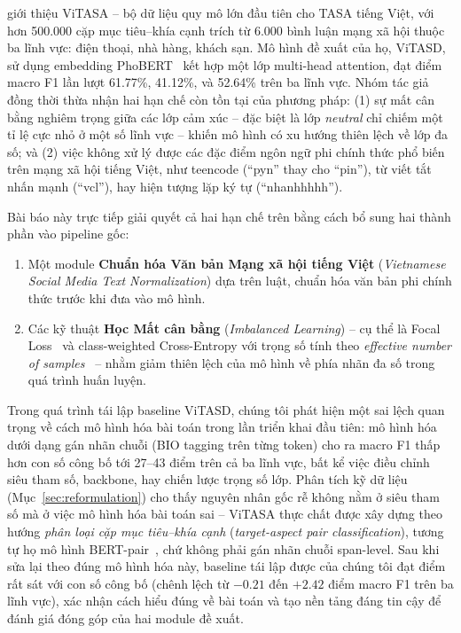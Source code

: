 \documentclass[11pt]{article}
\begin{document}
\citet{tran2025vitasa} giới thiệu ViTASA -- bộ dữ liệu quy mô lớn đầu tiên cho TASA tiếng Việt, với hơn 500.000 cặp mục tiêu--khía cạnh trích từ 6.000 bình luận mạng xã hội thuộc ba lĩnh vực: điện thoại, nhà hàng, khách sạn. Mô hình đề xuất của họ, ViTASD, sử dụng embedding PhoBERT~\citep{nguyen2020phobert} kết hợp một lớp multi-head attention, đạt điểm macro F1 lần lượt 61.77\%, 41.12\%, và 52.64\% trên ba lĩnh vực. Nhóm tác giả đồng thời thừa nhận hai hạn chế còn tồn tại của phương pháp: (1) sự mất cân bằng nghiêm trọng giữa các lớp cảm xúc -- đặc biệt là lớp \textit{neutral} chỉ chiếm một tỉ lệ cực nhỏ ở một số lĩnh vực -- khiến mô hình có xu hướng thiên lệch về lớp đa số; và (2) việc không xử lý được các đặc điểm ngôn ngữ phi chính thức phổ biến trên mạng xã hội tiếng Việt, như teencode (``pyn'' thay cho ``pin''), từ viết tắt nhấn mạnh (``vcl''), hay hiện tượng lặp ký tự (``nhanhhhhh'').

Bài báo này trực tiếp giải quyết cả hai hạn chế trên bằng cách bổ sung hai thành phần vào pipeline gốc:

\begin{enumerate}
    \item Một module \textbf{Chuẩn hóa Văn bản Mạng xã hội tiếng Việt} (\textit{Vietnamese Social Media Text Normalization}) dựa trên luật, chuẩn hóa văn bản phi chính thức trước khi đưa vào mô hình.
    \item Các kỹ thuật \textbf{Học Mất cân bằng} (\textit{Imbalanced Learning}) -- cụ thể là Focal Loss~\citep{lin2017focal} và class-weighted Cross-Entropy với trọng số tính theo \textit{effective number of samples}~\citep{cui2019classbalanced} -- nhằm giảm thiên lệch của mô hình về phía nhãn đa số trong quá trình huấn luyện.
\end{enumerate}

Trong quá trình tái lập baseline ViTASD, chúng tôi phát hiện một sai lệch quan trọng về cách mô hình hóa bài toán trong lần triển khai đầu tiên: mô hình hóa dưới dạng gán nhãn chuỗi (BIO tagging trên từng token) cho ra macro F1 thấp hơn con số công bố tới 27--43 điểm trên cả ba lĩnh vực, bất kể việc điều chỉnh siêu tham số, backbone, hay chiến lược trọng số lớp. Phân tích kỹ dữ liệu (Mục~\ref{sec:reformulation}) cho thấy nguyên nhân gốc rễ không nằm ở siêu tham số mà ở việc mô hình hóa bài toán sai -- ViTASA thực chất được xây dựng theo hướng \textit{phân loại cặp mục tiêu--khía cạnh} (\textit{target-aspect pair classification}), tương tự họ mô hình BERT-pair~\citep{sun2019utilizing}, chứ không phải gán nhãn chuỗi span-level. Sau khi sửa lại theo đúng mô hình hóa này, baseline tái lập được của chúng tôi đạt điểm rất sát với con số công bố (chênh lệch từ $-0.21$ đến $+2.42$ điểm macro F1 trên ba lĩnh vực), xác nhận cách hiểu đúng về bài toán và tạo nền tảng đáng tin cậy để đánh giá đóng góp của hai module đề xuất.
\end{document}
